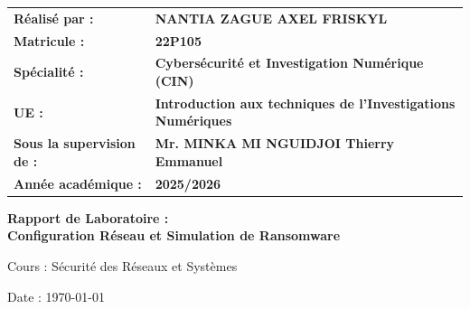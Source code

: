 \documentclass[12pt,a4paper]{article}
\begin{document}
\begin{titlepage}
			\begin{tabular}{@{}>{\bfseries}l l@{}}
				\vspace{0.5cm}
				Réalisé par : & \textbf{NANTIA ZAGUE AXEL FRISKYL} \\
				\vspace{0.5cm}
				Matricule : & \textbf{22P105} \\
				\vspace{0.5cm}
				Spécialité : & \textbf{Cybersécurité et Investigation Numérique (CIN)} \\
				\vspace{0.5cm}
				UE : & \textbf{Introduction aux techniques de l'Investigations Numériques} \\
				\vspace{0.5cm}
				Sous la supervision de : & \textbf{Mr. MINKA MI NGUIDJOI Thierry Emmanuel} \\
				\vspace{0.5cm}
				Année académique : & \textbf{2025/2026} \\
			\end{tabular}
			
		\end{titlepage}
		
		\thispagestyle{empty}
		\newpage
	
	\begin{titlepage}
		\centering
		\vspace*{1cm}
		{\LARGE\bfseries Rapport de Laboratoire :\\Configuration Réseau et Simulation de Ransomware\par}
		\vspace{1.5cm}
		{\large Cours : Sécurité des Réseaux et Systèmes\par}
		\vspace{1cm}
		{\large Date : \today\par}
		\vspace{2cm}
		\begin{abstract}
			Ce rapport présente les travaux réalisés dans le cadre de deux laboratoires de sécurité informatique. Le premier labo concerne la configuration d'un environnement réseau sécurisé avec GNS3, intégrant un firewall FortiGate et une DMZ. Le deuxième labo porte sur le développement et le test d'un ransomware simulé pour comprendre les mécanismes de cette menace cybernétique.
		\end{abstract}
		\vfill
	\end{titlepage}
	
\end{document}
